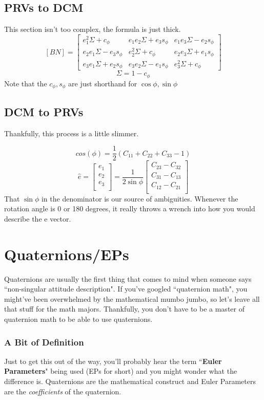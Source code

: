 \documentclass[a4paper,14pt]{extreport}
\begin{document}
\section{PRVs to DCM}
This section isn't too complex, the formula is just thick.
\[[BN] = \begin{bmatrix}
			e_1^2\Sigma+c_\phi&e_1 e_2 \Sigma + e_3 s_\phi&e_1 e_3 \Sigma - e_2 s_\phi\\
			e_2 e_1 \Sigma - e_3 s_\phi&e_2^2 \Sigma + c_\phi&e_2 e_3 \Sigma + e_1 s_\phi\\
			e_3 e_1 \Sigma + e_2 s_\phi&e_3 e_2 \Sigma - e_1 s_\phi&e_3^2 \Sigma + c_\phi
	\end{bmatrix}\]	
\[
\Sigma = 1-c_\phi
\]
Note that the $c_\phi,s_\phi$ are just shorthand for $\cos{\phi},\sin{\phi}$
\section{DCM to PRVs}
Thankfully, this process is a little slimmer.

\[
cos(\phi) = \dfrac{1}{2}(C_{11}+C_{22}+C_{33}-1)
\]
\[
\hat{e} = \begin{bmatrix}
e_1\\e_2\\e_3\\
\end{bmatrix} = \dfrac{1}{2\sin{\phi}}
\begin{bmatrix}
C_{23}-C_{32}\\C_{31}-C_{13}\\C_{12}-C_{21}\\
\end{bmatrix}
\]
That $\sin{\phi}$ in the denominator is our source of ambiguities. Whenever the rotation angle is 0 or 180 degrees, it really throws a wrench into how you would describe the e vector.
\chapter{Quaternions/EPs}

Quaternions are usually the first thing that comes to mind when someone says ``non-singular attitude description". If you've googled ``quaternion math", you might've been overwhelmed by the mathematical mumbo jumbo, so let's leave all that stuff for the math majors. Thankfully, you don't have to be a master of quaternion math to be able to use quaternions.
\subsection{A Bit of Definition}
Just to get this out of the way, you'll probably hear the term ``\textbf{Euler Parameters}" being used (EPs for short) and you might wonder what the difference is. Quaternions are the mathematical construct and Euler Parameters are the \emph{coefficients} of the quaternion.\\
\end{document}
